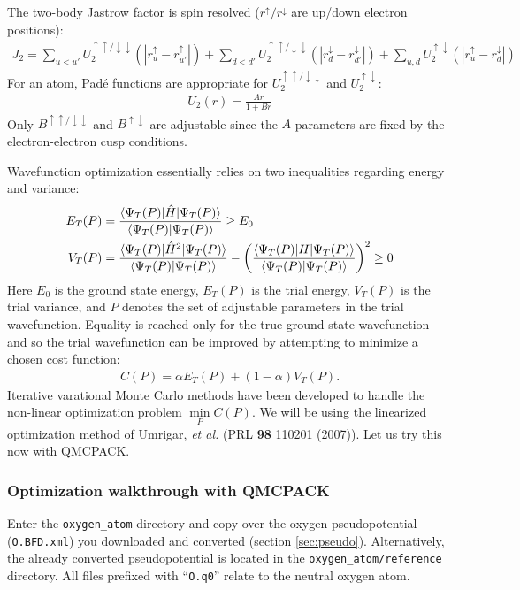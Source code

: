 The two-body Jastrow factor is spin resolved ($r^\uparrow/r^\downarrow$ are up/down electron positions):
\begin{align}\label{eq:J2}
  J_2 = \sum_{u<u'}U_2^{\uparrow\uparrow/\downarrow\downarrow}(|r_u^\uparrow-r_{u'}^\uparrow|) + \sum_{d<d'}U_2^{\uparrow\uparrow/\downarrow\downarrow}(|r_d^\downarrow-r_{d'}^\downarrow|) + \sum_{u,d} U_2^{\uparrow\downarrow}(|r_u^\uparrow-r_d^\downarrow|)
\end{align}
For an atom, Pad\'{e} functions are appropriate for $U_2^{\uparrow\uparrow/\downarrow\downarrow}$ and $U_2^{\uparrow\downarrow}$:
\begin{align}
  U_2(r) = \frac{Ar}{1+Br}
\end{align}
Only $B^{\uparrow\uparrow/\downarrow\downarrow}$ and $B^{\uparrow\downarrow}$ are adjustable since the $A$ parameters are fixed by the electron-electron cusp conditions.

Wavefunction optimization essentially relies on two inequalities regarding energy and variance:
\begin{align}
  E_T(P) &= \frac{\langle \Psi_T(P) \rvert\hat{H}\lvert \Psi_T(P) \rangle}{\langle \Psi_T(P) \lvert \Psi_T(P) \rangle} \ge E_0 \\
  V_T(P) &= \frac{\langle \Psi_T(P) \rvert\hat{H}^2\lvert \Psi_T(P) \rangle}{\langle \Psi_T(P) \lvert \Psi_T(P) \rangle} - \left(\frac{\langle \Psi_T(P) \rvert H\lvert \Psi_T(P) \rangle}{\langle \Psi_T(P) \lvert \Psi_T(P) \rangle}\right)^2 \ge 0   
\end{align}
Here $E_0$ is the ground state energy, $E_T(P)$ is the trial energy, $V_T(P)$ is the trial variance, and $P$ denotes the set of adjustable parameters in the trial wavefunction.  Equality is reached only for the true ground state wavefunction and so the trial wavefunction can be improved by attempting to minimize a chosen cost function: 
\begin{align}
  C(P) = \alpha E_T(P) + (1-\alpha) V_T(P).
\end{align}  
Iterative varational Monte Carlo methods have been developed to handle the non-linear optimization problem $\min\limits_P C(P)$.  We will be using the linearized optimization method of Umrigar, \emph{et al.} (PRL \textbf{98} 110201 (2007)).  Let us try this now with QMCPACK.


\subsubsection{Optimization walkthrough with QMCPACK}\label{sec:opt_walkthrough}
Enter the \texttt{oxygen\_atom} directory and copy over the oxygen pseudopotential (\texttt{O.BFD.xml}) you downloaded and converted (section \ref{sec:pseudo}).  Alternatively, the already converted pseudopotential is located in the \texttt{oxygen\_atom/reference} directory.  All files prefixed with ``\texttt{O.q0}'' relate to the neutral oxygen atom.  

